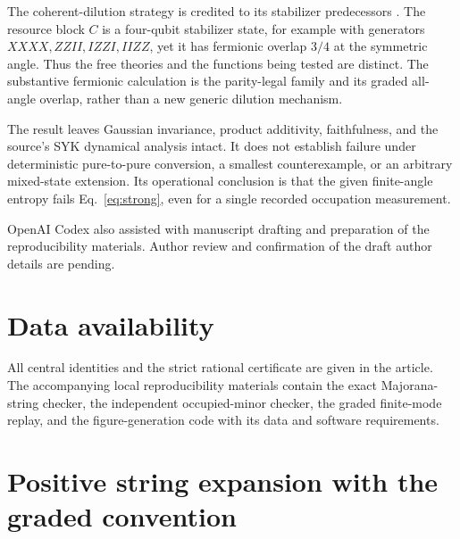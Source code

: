 \documentclass[aps,pra,reprint,amsmath,amssymb,longbibliography,floatfix]{revtex4-2}
\begin{document}
The coherent-dilution strategy is credited to its stabilizer
predecessors \cite{HaugPiroli2023,LeoneBittelMagic2024}.
The resource block \(C\) is a four-qubit stabilizer state, for example
with generators \(XXXX,ZZII,IZZI,IIZZ\), yet it has fermionic
overlap \(3/4\) at the symmetric angle. Thus the free theories
and the functions being tested are distinct. The substantive
fermionic calculation is the parity-legal family and its graded
all-angle overlap, rather than a new generic dilution mechanism.

The result leaves Gaussian invariance, product additivity,
faithfulness, and the source's SYK dynamical analysis intact.
It does not establish failure under deterministic pure-to-pure
conversion, a smallest counterexample, or an arbitrary mixed-state
extension. Its operational conclusion is that the given
finite-angle entropy fails Eq.~\eqref{eq:strong}, even for a
single recorded occupation measurement.

\begin{acknowledgments}
OpenAI Codex also assisted with manuscript drafting and preparation
of the reproducibility materials. Author review and confirmation
of the draft author details are pending.
\end{acknowledgments}

\section*{Data availability}
All central identities and the strict rational certificate are given
in the article. The accompanying local reproducibility materials contain
the exact Majorana-string checker, the independent occupied-minor
checker, the graded finite-mode replay, and the figure-generation
code with its data and software requirements.

\appendix
\section{Positive string expansion with the graded convention}
\label{app:strings}
\end{document}
